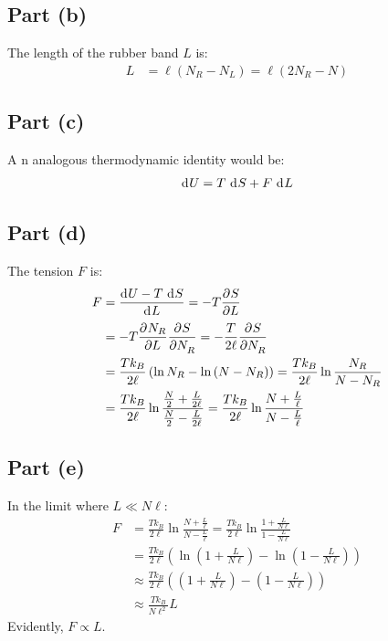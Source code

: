 \documentclass{article}
\begin{document}
\subsection*{Part (b)}
The length of the rubber band $L$ is:
\begin{equation}
    \begin{split}
        L & = \ell\left(N_R - N_L\right) = \ell\left(2N_R - N\right)
    \end{split}
\end{equation}
\subsection*{Part (c)}A
n analogous thermodynamic identity would be:
\begin{equation}
    \begin{split}
        \diff{U} & = T \, \diff{S} + F \, \diff{L} \\
    \end{split}
\end{equation}
\subsection*{Part (d)}
The tension $F$ is:
\begin{equation}
    \begin{split}
        F & = \frac{\diff{U} - T \, \diff{S}}{\diff{L}} = -T\pderiv{S}{L} \\
        & = -T\pderiv{N_R}{L}\pderiv{S}{N_R} = -\frac{T}{2\ell}\pderiv{S}{N_R} \\
        & = \frac{Tk_B}{2\ell}\left(\ln N_R - \ln\left(N - N_R\right)\right) = \frac{Tk_B}{2\ell}\ln \frac{N_R}{N - N_R} \\
        & = \frac{Tk_B}{2\ell}\ln \frac{\frac{N}{2} + \frac{L}{2\ell}}{\frac{N}{2} - \frac{L}{2\ell}} = \frac{Tk_B}{2\ell}\ln \frac{N + \frac{L}{\ell}}{N - \frac{L}{\ell}}
    \end{split}
\end{equation}
\subsection*{Part (e)}
In the limit where $L \ll N\ell$:
\begin{equation}
    \begin{split}
        F & = \frac{Tk_B}{2\ell}\ln \frac{N + \frac{L}{\ell}}{N - \frac{L}{\ell}} = \frac{Tk_B}{2\ell}\ln \frac{1 + \frac{L}{N\ell}}{1 - \frac{L}{N\ell}} \\
        & = \frac{Tk_B}{2\ell}\left(\ln \left(1 + \frac{L}{N\ell}\right) - \ln\left(1 - \frac{L}{N\ell}\right)\right) \\
        & \approx \frac{Tk_B}{2\ell}\left(\left(1 + \frac{L}{N\ell}\right) - \left(1 - \frac{L}{N\ell}\right)\right) \\
        & \approx \frac{Tk_B}{N\ell^2}L
    \end{split}
\end{equation}
Evidently, $F \propto L$.
\end{document}
